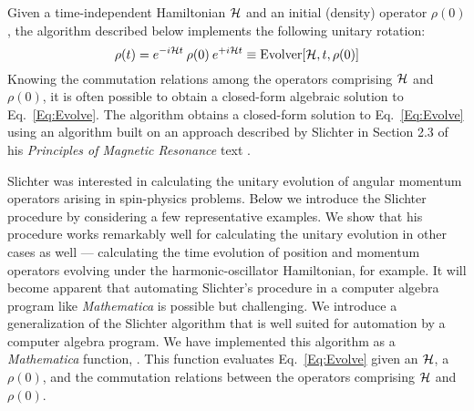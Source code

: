 %
%
%
%
%
%
%
%
%

\cite{Helton2015feb} \cite{Levitt2015mar}

Given a time-independent Hamiltonian ${\cal H}$ and an initial (density) operator $\rho(0)$, the  algorithm described below implements the following unitary rotation:
\begin{equation}
\rho(t) 
	= e^{-i {\cal H} t} \: \rho(0) \: e^{+i {\cal H} t}
	\equiv \text{{Evolver}}[{\cal H},t,\rho(0)]
	\label{Eq:Evolve}
\end{equation}
Knowing the commutation relations among the operators comprising ${\cal H}$ and $\rho(0)$, it is often possible to obtain a closed-form algebraic solution to Eq.~\ref{Eq:Evolve}.  The  algorithm obtains a closed-form solution to Eq.~\ref{Eq:Evolve} using an algorithm built on an approach described by Slichter in Section 2.3 of his \emph{Principles of Magnetic Resonance} text \cite{Slichter1990}.

Slichter was interested in calculating the unitary evolution of angular momentum operators arising in spin-physics problems.  Below we introduce the Slichter procedure by considering a few representative examples.  We show that his procedure works remarkably well for calculating the unitary evolution in other cases as well --- calculating the time evolution of position and momentum operators evolving under the harmonic-oscillator Hamiltonian, for example.  It will become apparent that automating Slichter's procedure in a computer algebra program like \emph{Mathematica} is possible but challenging.  We introduce a generalization of the Slichter algorithm that is well suited for automation by a computer algebra program.  We have implemented this algorithm as a \emph{Mathematica} function, .  This function evaluates Eq.~\ref{Eq:Evolve} given an ${\cal H}$, a $\rho(0)$, and the commutation relations between the operators comprising ${\cal H}$ and $\rho(0)$.

